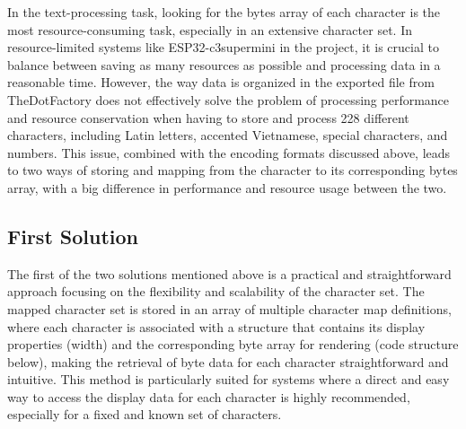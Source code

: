 \documentclass[../Main.tex]{subfiles}
\begin{document}
\begin{center}
    {\fontsize{10pt}{8pt}\selectfont 
    }
\end{center}

In the text-processing task, looking for the bytes array of each character is the most resource-consuming task, especially in an extensive character set. In resource-limited systems like ESP32-c3supermini in the project, it is crucial to balance between saving as many resources as possible and processing data in a reasonable time. However, the way data is organized in the exported file from TheDotFactory does not effectively solve the problem of processing performance and resource conservation when having to store and process 228 different characters, including Latin letters, accented Vietnamese, special characters, and numbers. This issue, combined with the encoding formats discussed above, leads to two ways of storing and mapping from the character to its corresponding bytes array, with a big difference in performance and resource usage between the two.

\subsection{First Solution}
The first of the two solutions mentioned above is a practical and straightforward approach focusing on the flexibility and scalability of the character set. The mapped character set is stored in an array of multiple character map definitions, where each character is associated with a structure that contains its display properties (width) and the corresponding byte array for rendering (code structure below), making the retrieval of byte data for each character straightforward and intuitive. This method is particularly suited for systems where a direct and easy way to access the display data for each character is highly recommended, especially for a fixed and known set of characters.
\end{document}
